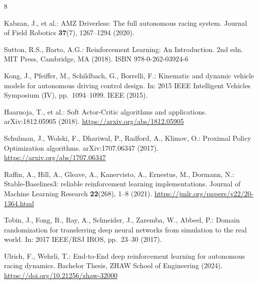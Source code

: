 \documentclass[runningheads]{llncs}
\begin{document}
\begin{thebibliography}{8}

Kabzan, J., et al.: AMZ Driverless: The full autonomous racing system. Journal of Field Robotics \textbf{37}(7), 1267--1294 (2020). 

Sutton, R.S., Barto, A.G.: Reinforcement Learning: An Introduction. 2nd edn. MIT Press, Cambridge, MA (2018). ISBN 978-0-262-03924-6

Kong, J., Pfeiffer, M., Schildbach, G., Borrelli, F.: Kinematic and dynamic vehicle models for autonomous driving control design. In: 2015 IEEE Intelligent Vehicles Symposium (IV), pp.~1094--1099. IEEE (2015). 

Haarnoja, T., et al.: Soft Actor-Critic algorithms and applications. arXiv:1812.05905 (2018). \url{https://arxiv.org/abs/1812.05905}

Schulman, J., Wolski, F., Dhariwal, P., Radford, A., Klimov, O.: Proximal Policy Optimization algorithms. arXiv:1707.06347 (2017). \url{https://arxiv.org/abs/1707.06347}

Raffin, A., Hill, A., Gleave, A., Kanervisto, A., Ernestus, M., Dormann, N.: Stable-Baselines3: reliable reinforcement learning implementations. Journal of Machine Learning Research \textbf{22}(268), 1--8 (2021). \url{https://jmlr.org/papers/v22/20-1364.html}

Tobin, J., Fong, R., Ray, A., Schneider, J., Zaremba, W., Abbeel, P.: Domain randomization for transferring deep neural networks from simulation to the real world. In: 2017 IEEE/RSJ IROS, pp.~23--30 (2017). 

Ulrich, F., Wehrli, T.: End-to-End deep reinforcement learning for autonomous racing dynamics. Bachelor Thesis, ZHAW School of Engineering (2024). \url{https://doi.org/10.21256/zhaw-32000}

\end{thebibliography}
\end{document}
